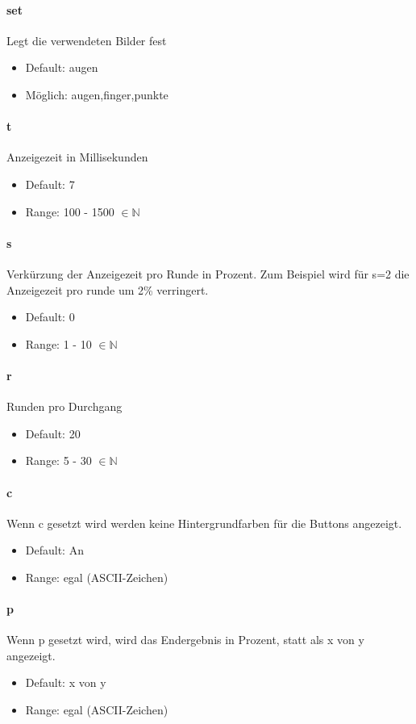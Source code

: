 \documentclass[]{article}
\begin{document}
\begin{multicols}{2}

	\paragraph{set}  Legt die verwendeten Bilder fest
	\begin{itemize}
		\item Default: augen
		\item Möglich: augen,finger,punkte
	\end{itemize}

	\paragraph{t} Anzeigezeit in Millisekunden

	\begin{itemize}
		\item Default: 7
		\item Range: 100 - 1500 $\in \mathbb{N}$
	\end{itemize}

	\paragraph{s} Verkürzung der Anzeigezeit pro Runde in Prozent. Zum Beispiel wird für s=2 die Anzeigezeit pro runde um 2\% verringert.
	\begin{itemize}
		\item Default: 0
		\item Range: 1 - 10 $\in \mathbb{N}$
	\end{itemize}

	\paragraph{r}  Runden pro Durchgang
	\begin{itemize}
		\item Default: 20
		\item Range: 5 - 30 $\in \mathbb{N}$
	\end{itemize}

	\paragraph{c}  Wenn c gesetzt wird werden keine Hintergrundfarben für die Buttons angezeigt.
	\begin{itemize}
		\item Default: An
		\item Range: egal (ASCII-Zeichen)
	\end{itemize}

	\paragraph{p}  Wenn p gesetzt wird, wird das Endergebnis in Prozent, statt als x von y angezeigt.
	\begin{itemize}
		\item Default: x von y
		\item Range: egal (ASCII-Zeichen)
	\end{itemize}

	\end{multicols}
\end{document}
